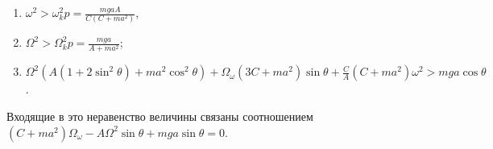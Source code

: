 \begin{enumerate}
	\item $\omega ^2 > \omega ^2_kp = \frac{mgaA}{C(C + ma^2)}$,
	\item $\Omega ^2 > \Omega ^2_kp = \frac{mga}{A + ma^2}$;
	\item $\Omega ^2\left( A(1 + 2\sin^2{\theta}) +
	ma^2\cos^2{\theta}\right)+
	\Omega _{\omega}(3C + ma^2)\sin{\theta} +
	\frac{C}{A}(C + ma^2)\omega ^2 > mga\cos{\theta}$.
\end{enumerate}
Входящие в это неравенство величины связаны соотношением
$(C + ma^2)\Omega _{\omega} - A\Omega ^2\sin{\theta}+
mga\sin{\theta} = 0$.
